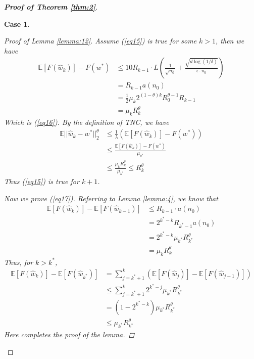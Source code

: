 \documentclass[12pt]{alt2022} %
\newtheorem{case}{Case}
\begin{document}
\begin{proof}[{\bf Proof of Theorem \ref{thm:2}}]
\begin{case}
\begin{proof}[Proof of Lemma \ref{lemma:12}]
Assume (\ref{eq15}) is true for some $k>1$, then we have
	\begin{equation}
\begin{aligned}
\mathbb{E}[F(\hat{w}_k)]-F(w^{*})&\leq 10 R_{k-1}\cdot L\left(\frac{1}{\sqrt{n_0}}+\frac{\sqrt{d\log(1/\delta)}}{\epsilon\cdot n_0}\right)\\
&=R_{k-1} a(n_0)\\
&=\frac{1}{2}\mu_k 2^{(1-\theta)k} R_0^{\theta-1} R_{k-1}\\
&=\mu_k R_k^{\theta}
\end{aligned}
\end{equation}
Which is (\ref{eq16}). By the definition of TNC,  we have 
	\begin{equation}
\begin{aligned}
\mathbb{E}||\hat{w}_k-w^{*}||_2^{\theta}&\leq \frac{1}{\lambda} (\mathbb{E}[F(\hat{w}_k)]-F(w^{*}))\\
&\leq \frac{\mathbb{E}[F(\hat{w}_k)]-F(w^{*})}{\mu_{k^{*}}}\\&\leq \frac{\mu_k R_k^{\theta}}{\mu_{k^{*}}}\leq R_k^{\theta}
\end{aligned}
\end{equation}
Thus (\ref{eq15}) is true for $k+1$.

Now we prove (\ref{eq17}). 
Referring to Lemma \ref{lemma:4}, we know that 
	\begin{equation*}
\begin{aligned}
\mathbb{E}[F(\hat{w}_k)]-\mathbb{E}[F(\hat{w}_{k-1})]
&\leq R_{k-1} \cdot a(n_0)\\
&=2^{k^{*}-k} R_{k^{*}-1} a(n_0)\\
&=2^{k^{*}-k} \mu_{k^{*}}R_{k^{*}}^{\theta}\\
&=\mu_k R_k^{\theta}
\end{aligned}
\end{equation*}
Thus, for $k>k^{*}$,
	\begin{equation*}
\begin{aligned}
\mathbb{E}[F(\hat{w}_k)]-\mathbb{E}[F(\hat{w}_{k^{*}})]
&=\sum\limits_{j=k^{*}+1}^{k}
(\mathbb{E}[F(\hat{w}_j)]-\mathbb{E}[F(\hat{w}_{j-1})])\\
&\leq \sum\limits_{j=k^{*}+1}^{k}2^{k^{*}-j}\mu_{k^{*}} R_{k^{*}}^{\theta}\\
&=(1-2^{k^{*}-k})\mu_{k^{*}}R_{k^{*}}^{\theta}\\
&\leq \mu_{k^{*}}R_{k^{*}}^{\theta}
\end{aligned}
\end{equation*}
Here completes the proof of the lemma.
\end{proof}


\end{case}
\end{proof}
\end{document}
